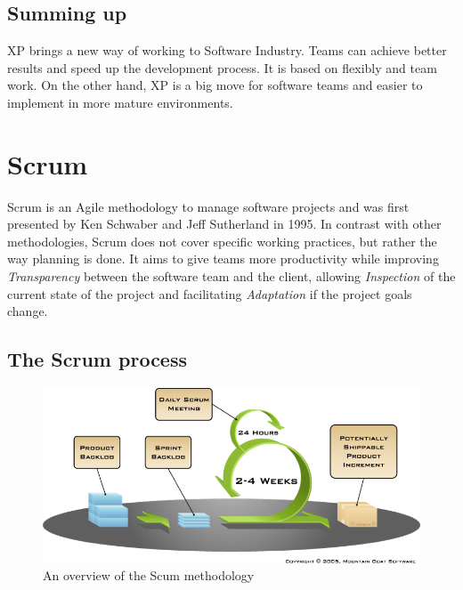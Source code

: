 \documentclass[conference]{IEEEtran}
\begin{document}
\subsection{Summing up}
XP brings a new way of working to Software Industry. Teams can achieve better results and speed up the development process. It is based on flexibly and team work. On the other hand, XP is a big move for software teams and easier to implement in more mature environments.

\section{Scrum}

Scrum is an Agile methodology to manage software projects and was first presented by Ken Schwaber and Jeff Sutherland in 1995\cite{Schwaber:wr}. In contrast with other methodologies, Scrum does not cover specific working practices, but rather the way planning is done. It aims to give teams more productivity while improving \textit{Transparency} between the software team and the client, allowing \textit{Inspection} of the current state of the project and facilitating \textit{Adaptation} if the project goals change.

\subsection{The Scrum process}



\begin{figure}
\centering
\includegraphics[width=\linewidth]{scrum.png}
\caption{An overview of the Scum methodology \cite{MountainGoatSoftware:raENhEga}}
\label{fig:scrum}
\end{figure}
\end{document}
